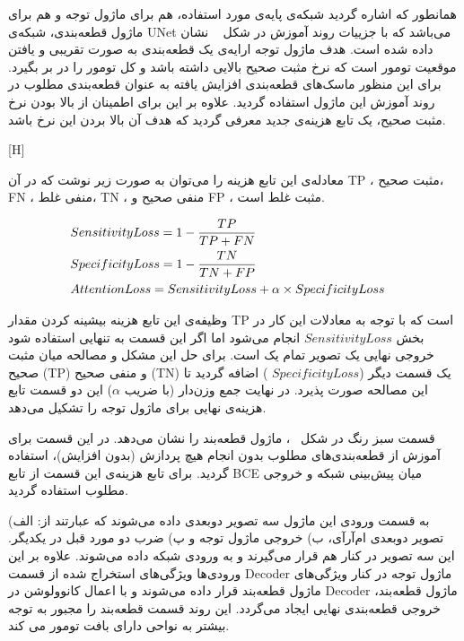 همانطور که اشاره گردید شبکه‌ی پایه‌ی مورد استفاده، هم برای ماژول توجه و هم برای ماژول قطعه‌بندی، شبکه‌ی UNet می‌باشد که با جزییات روند آموزش در شکل ~ نشان داده شده است. هدف ماژول توجه ارایه‌ی یک قطعه‌بندی به صورت تقریبی و یافتن موقعیت تومور است که نرخ مثبت صحیح بالایی داشته باشد و کل تومور را در بر بگیرد. برای این منظور ماسک‌های قطعه‌بندی افزایش یافته به عنوان قطعه‌بندی مطلوب در روند آموزش این ماژول استفاده گردید. علاوه بر این برای اطمینان از بالا بودن نرخ مثبت صحیح، یک تابع هزینه‌ی جدید معرفی گردید که هدف آن بالا بردن این نرخ باشد. 

[H]

معادله‌ی این تابع هزینه را می‌توان به صورت زیر نوشت که در آن TP ، مثبت صحیح، FN ، منفی غلط، TN ، منفی صحیح و FP ، مثبت غلط است. 

\begin{alignat}{5}
	&SensitivityLoss = 1-\frac{TP}{TP+FN}  \notag && \\
	&SpecificityLoss = 1-\frac{TN}{TN+FP} \notag && \\
	&AttentionLoss = SensitivityLoss + \alpha \times SpecificityLoss \label{attloss} && 
\end{alignat}

وظیفه‌ی این تابع هزینه بیشینه کردن مقدار TP است که با توجه به معادلات این کار در بخش $SensitivityLoss$ انجام می‌شود اما اگر این قسمت به تنهایی استفاده شود خروجی نهایی یک تصویر تمام یک است. برای حل این مشکل و مصالحه میان مثبت صحیح (TP) و منفی صحیح (TN) یک قسمت دیگر ($SpecificityLoss$ ) اضافه گردید تا این مصالحه صورت پذیرد. در نهایت جمع وزن‌دار (با ضریب $\alpha$) این دو قسمت تابع هزینه‌ی نهایی برای ماژول توجه را تشکیل می‌دهد.


قسمت سبز رنگ در شکل ~، ماژول قطعه‌بند را نشان می‌دهد. در این قسمت برای آموزش از قطعه‌بندی‌های مطلوب بدون انجام هیچ پردازش (بدون افزایش)، استفاده گردید. برای تابع هزینه‌ی این قسمت از تابع BCE میان پیش‌بینی شبکه و خروجی مطلوب استفاده گردید. 

به قسمت ورودی این ماژول سه تصویر دوبعدی داده می‌شوند که عبارتند از: الف) تصویر دوبعدی ام‌آرآی، ب) خروجی ماژول توجه و پ) ضرب دو مورد قبل در یکدیگر. این سه تصویر در کنار هم قرار می‌گیرند و به ورودی شبکه داده می‌شوند. علاوه بر این ورودی‌ها ویژگی‌های استخراج شده از قسمت Decoder ماژول توجه در کنار ویژگی‌های ماژول قطعه‌بند قرار داده می‌شوند و با اعمال کانوولوشن در Decoder ماژول قطعه‌بند، خروجی قطعه‌بندی نهایی ایجاد می‌گردد. این روند قسمت قطعه‌بند را مجبور به توجه بیشتر به نواحی دارای بافت تومور می کند.

